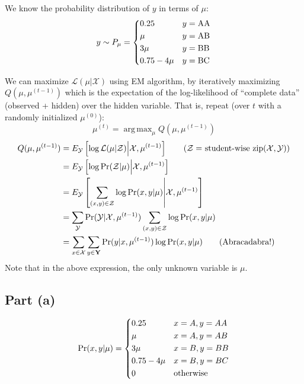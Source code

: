 \documentclass[11pt,a4paper,titlepage]{article}
\DeclareMathOperator*{\argmax}{arg\,max} %
\begin{document}
We know the probability distribution of $y$ in terms of $\mu$:
\[
    y \sim P_\mu =
    \begin{dcases}
        0.25 & y = \rm AA \\
        \mu & y = \rm AB \\
        3\mu & y = \rm BB \\
        0.75 - 4\mu & y = \rm BC
    \end{dcases}
\]

We can maximize $\mathcal{L}(\mu | \mathcal{X})$ using EM algorithm, by
iteratively maximizing $Q(\mu, \mu^{(t-1)})$ which is the expectation of the
log-likelihood of ``complete data'' (observed + hidden) over the hidden
variable. That is, repeat (over $t$ with a randomly initialized $\mu^{(0)}$):
\[
    \mu^{(t)} = \argmax_{\mu} Q(\mu, \mu^{(t-1)})
\]
\begin{align*}
    Q(\mu, \mu^{(t-1)}) &= E_{\mathcal{Y}} \left[ \log \mathcal{L}(\mu | \mathcal{Z})
                               \middle| \mathcal{X}, \mu^{(t-1)}
                               \right] \tag{$\mathcal{Z} =$ student-wise zip$(\mathcal{X, Y})$}\\
                        &= E_{\mathcal{Y}} \left[ \log \Pr(\mathcal{Z} | \mu)
                               \middle| \mathcal{X}, \mu^{(t-1)} \right] \\
                        &= E_{\mathcal{Y}} \left[ \sum_{(x, y) \in \mathcal{Z}} \log \Pr(x, y| \mu)
                               \middle| \mathcal{X}, \mu^{(t-1)} \right] \\
                        &= \sum_{\mathcal{Y}} \Pr(\mathcal{Y} | \mathcal{X}, \mu^{(t-1)})
                                              \sum_{(x, y) \in \mathcal{Z}} \log \Pr(x, y| \mu) \\
                        &= \sum_{x \in \mathcal{X}} \sum_{y \in \bf Y} \Pr (y | x, \mu^{(t-1)})
                                                        \log \Pr(x, y| \mu) \tag{Abracadabra!}
\end{align*}
Note that in the above expression, the only unknown variable is $\mu$.

\subsection*{Part (a)}

\[
    \Pr(x, y | \mu) =
    \begin{dcases}
        0.25 & x = A, y = AA \\
        \mu & x = A, y = AB \\
        3\mu & x = B, y = BB \\
        0.75 - 4\mu & x = B, y = BC \\
        0 & \rm otherwise
    \end{dcases}
\]
\end{document}
